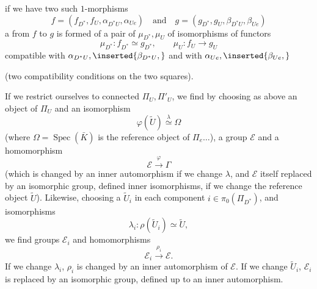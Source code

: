 

if we have two such $1$-morphisms
\[
f=(f_{D^*},f_U,\alpha_{D^*U},\alpha_{Ue})
\quad\text{and}\quad
g=(g_{D^*},g_U,\beta_{D^*U},\beta_{Ue})
\]
a  from $f$ to $g$ is formed of a pair of $\mu_{D^*},\mu_U$ of isomorphisms of functors
\[
\mu_{D^*}:f_{D^*}\simeq g_{D^*},\qquad
\mu_U:f_U\longrightarrow g_U
\]
compatible with $\alpha_{D^*U},\inserted{\beta_{D^*U},}$ and with $\alpha_{Ue},\inserted{\beta_{Ue},}$ 


 (two compatibility conditions on the two squares).

If we  restrict ourselves to connected $\Pi_U,\Pi'_U$, we find by choosing as above an object  of $\Pi_U$ and an isomorphism
\[
\boxed{\varphi(\widetilde U)\overset{\lambda}{\simeq}\Omega}
\]
(where $\Omega=\operatorname{Spec}(\bar K)$ is the reference object of $\Pi_e\ldots$), a group $\mathcal E$ and a homomorphism
\[
\mathcal E\xrightarrow{\varphi}\Gamma
\]
(which is changed by an inner automorphism if we change $\lambda$, and $\mathcal E$ itself replaced by an isomorphic group,  defined  inner isomorphisms, if we change the reference object $\widetilde U$). Likewise, choosing a $\widetilde U_i$ in each component $i\in\pi_0(\Pi_{D^*})$, and isomorphisms
\[
\lambda_i:\rho(\widetilde U_i)\simeq\widetilde U,
\]
we find groups $\mathcal E_i$ and homomorphisms
\[
\mathcal E_i\xrightarrow{\rho_i}\mathcal E.
\]
If we change $\lambda_i$, $\rho_i$ is changed by an inner automorphism of $\mathcal E$. If we change $\widetilde U_i$, $\mathcal E_i$ is replaced by an isomorphic group,  defined up to an inner automorphism.

